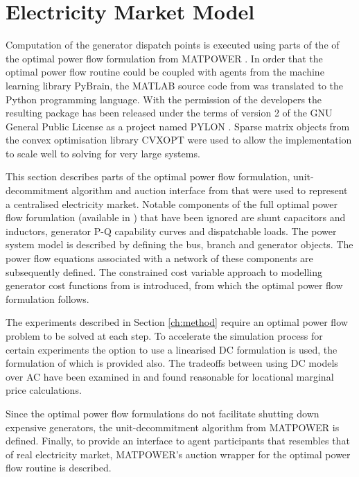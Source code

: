 \section{Electricity Market Model}
Computation of the generator dispatch points is executed using parts of the
of the optimal power flow formulation from MATPOWER \cite{zimmerman:mp_pes}.
In order that the optimal power flow routine could be coupled with agents from
the machine learning library PyBrain, the
MATLAB\textsuperscript{\texttrademark} source code from \matpower was
translated to the Python programming language.  With the permission of the
\matpower developers the resulting package has been released under the terms of
version 2 of the GNU General Public License as a project named
PYLON \cite{lincoln:pyreto}. Sparse matrix objects from the convex
optimisation library CVXOPT were used to allow the implementation to scale well to solving for very large systems.

This section describes parts of the optimal power flow formulation,
unit-decommitment algorithm and auction interface from \matpower that were used
to represent a centralised electricity market.  Notable components of the full
optimal power flow forumlation (available in \cite{pserc:mp_manual}) that have
been ignored are shunt capacitors and inductors, generator P-Q capability
curves and dispatchable loads. The power system model is described by defining
the bus, branch and generator objects.  The power flow equations associated with a network of these components are subsequently defined. The constrained cost variable approach to modelling generator cost
functions from \cite{zimmerman:ccv} is introduced, from which the optimal power
flow formulation follows.

The experiments described in Section \ref{ch:method} require an optimal power
flow problem to be solved at each step.  To accelerate the simulation process
for certain experiments the option to use a linearised DC formulation is used,
the formulation of which is provided also.  The tradeoffs between using DC
models over AC have been examined in \cite{overbye:acdc} and found reasonable
for locational marginal price calculations.

Since the optimal power flow formulations do not facilitate shutting down
expensive generators, the unit-decommitment algorithm from MATPOWER is defined.
Finally, to provide an interface to agent participants that resembles that of
real electricity market, MATPOWER's auction wrapper for the optimal power flow
routine is described.

